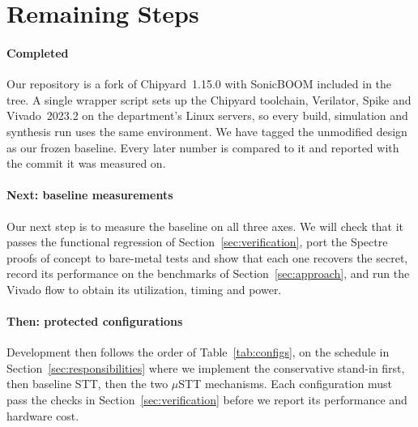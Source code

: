 \section{Remaining Steps}
\label{sec:remaining_steps}

\paragraph{Completed}
Our repository is a fork of Chipyard~1.15.0 with SonicBOOM included in the tree. A
single wrapper script sets up the Chipyard toolchain, Verilator, Spike and
Vivado~2023.2 on the department's Linux servers, so every build, simulation and
synthesis run uses the same environment. We have tagged the unmodified design as our
frozen baseline. Every later number is compared to it and reported with the commit it
was measured on.

\paragraph{Next: baseline measurements}
Our next step is to measure the baseline on all three axes. We will check that it
passes the functional regression of Section~\ref{sec:verification}, port the Spectre
proofs of concept to bare-metal tests and show that each one recovers the secret,
record its performance on the benchmarks of Section~\ref{sec:approach}, and run the
Vivado flow to obtain its utilization, timing and power.

\paragraph{Then: protected configurations}
Development then follows the order of Table~\ref{tab:configs}, on the schedule in
Section~\ref{sec:responsibilities} where we implement the conservative stand-in first, 
then baseline STT, then the two $\mu$STT mechanisms. Each configuration must pass the 
checks in Section~\ref{sec:verification} before we report its performance and hardware cost.
